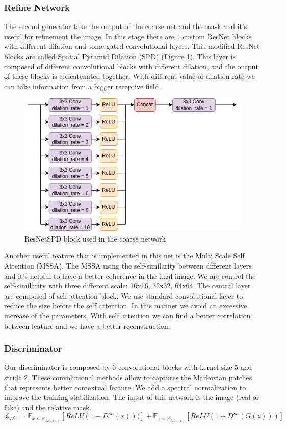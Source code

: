 \documentclass[10pt,twocolumn,letterpaper]{article}
\begin{document}
\subsubsection{Refine Network}
The second generator take the output of the coarse net and the mask and it's
useful for refinement the image.
In this stage there are 4 custom ResNet blocks with different dilation and some
gated convolutional layers.
This modified ResNet blocks are called Spatial Pyramid Dilation (SPD) (Figure
\ref{fig:rnspd}). This layer is composed of different convolutional blocks with
different dilation, and the output of these blocks is concatenated together.
With different value of dilation rate we can take information from a bigger
receptive field.
\begin{figure}
  \includegraphics[width=1\linewidth]{img/ResNetSPD.jpg}
  \caption{ResNetSPD block used in the coarse network}
  \label{fig:rnspd}
\end{figure}
Another useful feature that is implemented in this net is the Multi Scale Self
Attention (MSSA). The MSSA using the self-similarity between different layers
and it's helpful to have a better coherence in the final image. We are control
the self-similarity with three different scale: 16x16, 32x32, 64x64.
The central layer are composed of self attention block. We use standard
convolutional layer to reduce the size before the self attention. In this manner
we avoid an excessive increase of the parameters. With self attention we can
find a better correlation between feature and we have a better reconstruction.
\subsubsection{Discriminator}
Our discriminator is composed by 6 convolutional blocks with kernel size 5 and
stride 2.
These convolutional methods allow to captures the Markovian patches that
represents better contextual feature\cite{li2016precomputed}.
We add a spectral normalization to improve the training
stabilization\cite{miyato2018spectral}.
The input of this network is the image (real or fake) and the relative mask.
\begin{dmath}
        \mathcal{L}_{D^{sn}}= \mathbb{E}_{x\sim \mathbb{P}_{data(x)}} \left [
          ReLU(1-D^{sn}(x))) \right ] + \mathbb{E}_{z\sim \mathbb{P}_{data(x)}}
        \left [ ReLU(1+D^{sn}(G(z)))\right ]
\end{dmath}
\end{document}
